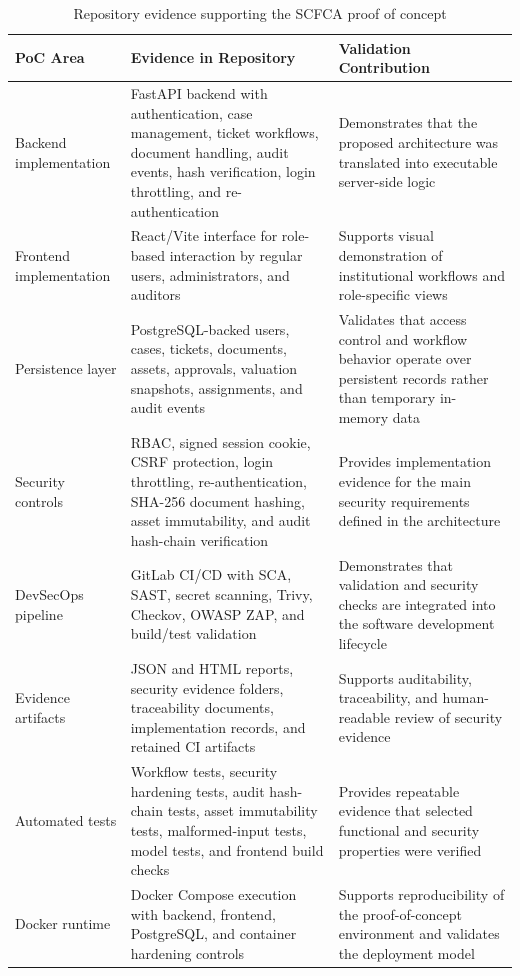 \documentclass[12pt,a4paper]{report}
\begin{document}
\begin{table}[htbp]
\centering
\caption{Repository evidence supporting the SCFCA proof of concept}
\label{tab:scfca-repository-evidence}
\begin{tabular}{p{} p{} p{}}
\hline
\textbf{PoC Area} & \textbf{Evidence in Repository} & \textbf{Validation Contribution} \\
\hline
Backend implementation & FastAPI backend with authentication, case management, ticket workflows, document handling, audit events, hash verification, login throttling, and re-authentication & Demonstrates that the proposed architecture was translated into executable server-side logic \\
\hline
Frontend implementation & React/Vite interface for role-based interaction by regular users, administrators, and auditors & Supports visual demonstration of institutional workflows and role-specific views \\
\hline
Persistence layer & PostgreSQL-backed users, cases, tickets, documents, assets, approvals, valuation snapshots, assignments, and audit events & Validates that access control and workflow behavior operate over persistent records rather than temporary in-memory data \\
\hline
Security controls & RBAC, signed session cookie, CSRF protection, login throttling, re-authentication, SHA-256 document hashing, asset immutability, and audit hash-chain verification & Provides implementation evidence for the main security requirements defined in the architecture \\
\hline
DevSecOps pipeline & GitLab CI/CD with SCA, SAST, secret scanning, Trivy, Checkov, OWASP ZAP, and build/test validation & Demonstrates that validation and security checks are integrated into the software development lifecycle \\
\hline
Evidence artifacts & JSON and HTML reports, security evidence folders, traceability documents, implementation records, and retained CI artifacts & Supports auditability, traceability, and human-readable review of security evidence \\
\hline
Automated tests & Workflow tests, security hardening tests, audit hash-chain tests, asset immutability tests, malformed-input tests, model tests, and frontend build checks & Provides repeatable evidence that selected functional and security properties were verified \\
\hline
Docker runtime & Docker Compose execution with backend, frontend, PostgreSQL, and container hardening controls & Supports reproducibility of the proof-of-concept environment and validates the deployment model \\
\hline
\end{tabular}
\end{table}
\end{document}
